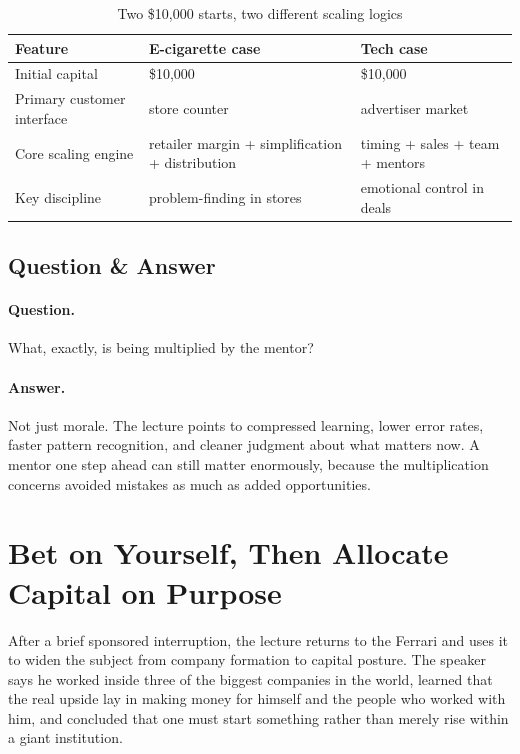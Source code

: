 \begin{table}[h]
\centering
\caption{Two \$10{,}000 starts, two different scaling logics}
\begin{tabular}{|l|l|l|}
\hline
Feature & E-cigarette case & Tech case \\
\hline
Initial capital & \$10{,}000 & \$10{,}000 \\
Primary customer interface & store counter & advertiser market \\
Core scaling engine & retailer margin + simplification + distribution & timing + sales + team + mentors \\
Key discipline & problem-finding in stores & emotional control in deals \\
\hline
\end{tabular}
\end{table}

\subsection{Question \& Answer}

\paragraph{Question.} What, exactly, is being multiplied by the mentor?

\paragraph{Answer.} Not just morale. The lecture points to compressed learning, lower error rates, faster pattern recognition, and cleaner judgment about what matters now. A mentor one step ahead can still matter enormously, because the multiplication concerns avoided mistakes as much as added opportunities.

\section{Bet on Yourself, Then Allocate Capital on Purpose}

After a brief sponsored interruption, the lecture returns to the Ferrari and uses it to widen the subject from company formation to capital posture. The speaker says he worked inside three of the biggest companies in the world, learned that the real upside lay in making money for himself and the people who worked with him, and concluded that one must start something rather than merely rise within a giant institution.

